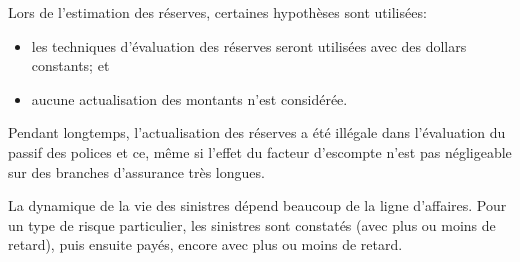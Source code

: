 Lors de l'estimation des réserves, certaines hypothèses sont utilisées:
\begin{itemize}
\item les techniques d'évaluation des réserves seront utilisées avec
  des dollars constants; et
\item aucune actualisation des montants n'est considérée.
\end{itemize}

Pendant longtemps, l'actualisation des réserves a été illégale dans
l'évaluation du passif des polices et ce, même si l'effet du facteur
d'escompte n'est pas négligeable sur des branches d'assurance très
longues.





La dynamique de la vie des sinistres dépend beaucoup de la ligne
d'affaires. Pour un type de risque particulier, les sinistres sont
constatés (avec plus ou moins de retard), puis ensuite payés, encore
avec plus ou moins de retard.

